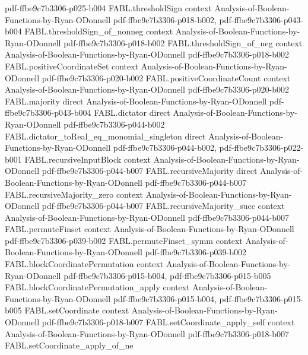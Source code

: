 \begin{theorem}
  {pdf-ffbe9c7b3306-p025-b004}
\proofstep
  {FABL.thresholdSign}
  {context}
  {Analysis-of-Boolean-Functions-by-Ryan-ODonnell}
  {pdf-ffbe9c7b3306-p018-b002,
    pdf-ffbe9c7b3306-p043-b004}
\proofstep
  {FABL.thresholdSign_of_nonneg}
  {context}
  {Analysis-of-Boolean-Functions-by-Ryan-ODonnell}
  {pdf-ffbe9c7b3306-p018-b002}
\proofstep
  {FABL.thresholdSign_of_neg}
  {context}
  {Analysis-of-Boolean-Functions-by-Ryan-ODonnell}
  {pdf-ffbe9c7b3306-p018-b002}
\proofstep
  {FABL.positiveCoordinateSet}
  {context}
  {Analysis-of-Boolean-Functions-by-Ryan-ODonnell}
  {pdf-ffbe9c7b3306-p020-b002}
\proofstep
  {FABL.positiveCoordinateCount}
  {context}
  {Analysis-of-Boolean-Functions-by-Ryan-ODonnell}
  {pdf-ffbe9c7b3306-p020-b002}
\proofstep
  {FABL.majority}
  {direct}
  {Analysis-of-Boolean-Functions-by-Ryan-ODonnell}
  {pdf-ffbe9c7b3306-p043-b004}
\proofstep
  {FABL.dictator}
  {direct}
  {Analysis-of-Boolean-Functions-by-Ryan-ODonnell}
  {pdf-ffbe9c7b3306-p044-b002}
\proofstep
  {FABL.dictator_toReal_eq_monomial_singleton}
  {direct}
  {Analysis-of-Boolean-Functions-by-Ryan-ODonnell}
  {pdf-ffbe9c7b3306-p044-b002,
    pdf-ffbe9c7b3306-p022-b001}
\proofstep
  {FABL.recursiveInputBlock}
  {context}
  {Analysis-of-Boolean-Functions-by-Ryan-ODonnell}
  {pdf-ffbe9c7b3306-p044-b007}
\proofstep
  {FABL.recursiveMajority}
  {direct}
  {Analysis-of-Boolean-Functions-by-Ryan-ODonnell}
  {pdf-ffbe9c7b3306-p044-b007}
\proofstep
  {FABL.recursiveMajority_zero}
  {context}
  {Analysis-of-Boolean-Functions-by-Ryan-ODonnell}
  {pdf-ffbe9c7b3306-p044-b007}
\proofstep
  {FABL.recursiveMajority_succ}
  {context}
  {Analysis-of-Boolean-Functions-by-Ryan-ODonnell}
  {pdf-ffbe9c7b3306-p044-b007}
\proofstep
  {FABL.permuteFinset}
  {context}
  {Analysis-of-Boolean-Functions-by-Ryan-ODonnell}
  {pdf-ffbe9c7b3306-p039-b002}
\proofstep
  {FABL.permuteFinset_symm}
  {context}
  {Analysis-of-Boolean-Functions-by-Ryan-ODonnell}
  {pdf-ffbe9c7b3306-p039-b002}
\proofstep
  {FABL.blockCoordinatePermutation}
  {context}
  {Analysis-of-Boolean-Functions-by-Ryan-ODonnell}
  {pdf-ffbe9c7b3306-p015-b004,
    pdf-ffbe9c7b3306-p015-b005}
\proofstep
  {FABL.blockCoordinatePermutation_apply}
  {context}
  {Analysis-of-Boolean-Functions-by-Ryan-ODonnell}
  {pdf-ffbe9c7b3306-p015-b004,
    pdf-ffbe9c7b3306-p015-b005}
\proofstep
  {FABL.setCoordinate}
  {context}
  {Analysis-of-Boolean-Functions-by-Ryan-ODonnell}
  {pdf-ffbe9c7b3306-p018-b007}
\proofstep
  {FABL.setCoordinate_apply_self}
  {context}
  {Analysis-of-Boolean-Functions-by-Ryan-ODonnell}
  {pdf-ffbe9c7b3306-p018-b007}
\proofstep
  {FABL.setCoordinate_apply_of_ne}

\end{theorem}
